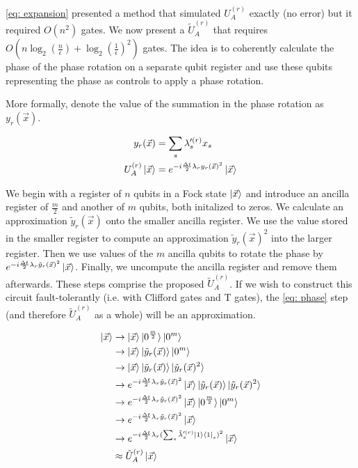 \eqref{eq: expansion} presented a method that simulated $U_A^{(r)}$ exactly (no error) but it required $O(n^2)$ gates. We now present a $\tilde{U}_A^{(r)}$ that requires $O(n\log_2(\frac{n}{\epsilon}) + \log_2(\frac{1}{\epsilon})^2)$ gates. The idea is to coherently calculate the phase of the phase rotation on a separate qubit register and use these qubits representing the phase as controls to apply a phase rotation.

More formally, denote the value of the summation in the phase rotation as $y_r(\vec{x})$.

\begin{equation}
    \begin{split}
        y_r(\vec{x}) &= \sum_s \lambda'^{(r)}_s x_s \\
        U_A^{(r)}\ket{\vec{x}} &= e^{-i\frac{\Delta t}{2}\lambda_ry_r(\vec{x})^2}\ket{\vec{x}}
    \end{split}
\end{equation}

We begin with a register of $n$ qubits in a Fock state $\ket{\vec{x}}$ and introduce an ancilla register of $\frac{m}{2}$ and another of $m$ qubits, both initalized to zeros. We calculate an approximation $\tilde{y}_r(\vec{x})$ onto the smaller ancilla register. We use the value stored in the smaller register to compute an approximation $\tilde{y}_r(\vec{x})^2$ into the larger register. Then we use values of the $m$ ancilla qubits to rotate the phase by $e^{-i\frac{\Delta t}{2}\lambda_r\tilde{y}_r(\vec{x})^2}\ket{\vec{x}}$. Finally, we uncompute the ancilla register and remove them afterwards. These steps comprise the proposed $\tilde{U}_A^{(r)}$. If we wish to construct this circuit fault-tolerantly (i.e. with Clifford gates and T gates), the \eqref{eq: phase} step (and therefore $\tilde{U}_A^{(r)}$ as a whole) will be an approximation. 

\begin{align}
    \ket{\vec{x}} &\rightarrow \ket{\vec{x}}\ket{0^{\frac{m}{2}}}\ket{0^m} \\
    &\rightarrow \ket{\vec{x}}\ket{\tilde{y}_r(\vec{x})}\ket{0^m} \label{eq: summation}\\
    &\rightarrow \ket{\vec{x}}\ket{\tilde{y}_r(\vec{x})}\ket{\tilde{y}_r(\vec{x})^2} \label{eq: squaring} \\
    &\rightarrow e^{-i\frac{\Delta t}{2}\lambda_r\tilde{y}_r(\vec{x})^2}\ket{\vec{x}}\ket{\tilde{y}_r(\vec{x})}\ket{\tilde{y}_r(\vec{x})^2} \label{eq: phase} \\
    &\rightarrow e^{-i\frac{\Delta t}{2}\lambda_r\tilde{y}_r(\vec{x})^2}\ket{\vec{x}}\ket{0^{\frac{m}{2}}}\ket{0^m} \\
    &\rightarrow e^{-i\frac{\Delta t}{2}\lambda_r\tilde{y}_r(\vec{x})^2}\ket{\vec{x}} \\
    &\rightarrow e^{-i\frac{\Delta t}{2}\lambda_r(\sum_s \tilde{\lambda}'^{(r)}_s \ket{1}\bra{1}_s)^2}\ket{\vec{x}} \\
    &\approx \tilde{U}_A^{(r)}\ket{\vec{x}}
\end{align}

